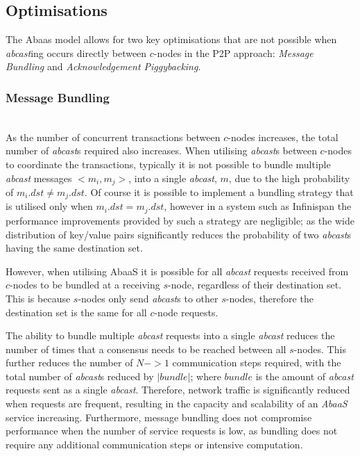 	\subsection{Optimisations}\label{ssec:abaas_optimisations}
	The \textsf{Abaas} model allows for two key optimisations that are not possible when \emph{abcast}ing occurs directly between $c$-nodes in the P2P approach: \emph{Message Bundling} and \emph{Acknowledgement Piggybacking}.  
	
		\subsubsection{Message Bundling} \label{ssec:bundling} \hspace{0pt} \\
		As the number of concurrent transactions between $c$-nodes increases, the total number of \emph{abcast}s required also increases.  When utilising \emph{abcast}s between $c$-nodes to coordinate the transactions, typically it is not possible to bundle multiple \emph{abcast} messages $<m_i, m_j>$, into a single \emph{abcast}, $m$, due to the high probability of $m_i.dst \neq m_j.dst$.  Of course it is possible to implement a bundling strategy that is utilised only when $m_i.dst = m_j.dst$, however in a system such as Infinispan the performance improvements provided by such a strategy are negligible; as the wide distribution of key/value pairs significantly reduces the probability of two \emph{abcast}s having the same destination set.  
		
		However, when utilising \textsf{AbaaS} it is possible for all \emph{abcast} requests received from $c$-nodes to be bundled at a receiving $s$-node, regardless of their destination set.  This is because $s$-nodes only send \emph{abcast}s to other $s$-nodes, therefore the destination set is the same for all $c$-node requests.  
		
		The ability to bundle multiple \emph{abcast} requests into a single \emph{abcast} reduces the number of times that a consensus needs to be reached between all $s$-nodes.  This further reduces the number of $N->1$ communication steps required, with the total number of \emph{abcast}s reduced by $\left\vert bundle \right\vert$; where $bundle$ is the amount of \emph{abcast} requests sent as a single \emph{abcast}.  Therefore, network traffic is significantly reduced when requests are frequent, resulting in the capacity and scalability of an \emph{AbaaS} service increasing. Furthermore, message bundling does not compromise performance when the number of service requests is low, as bundling does not require any additional communication steps or intensive computation.  
		
